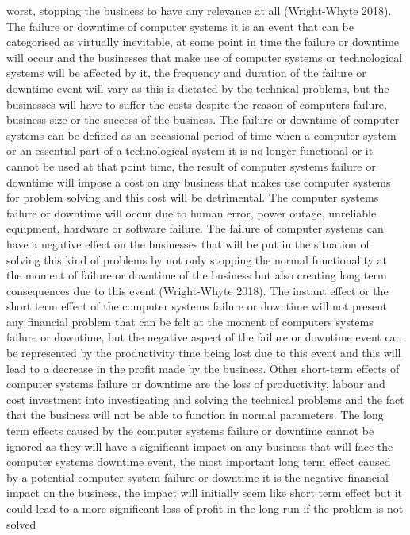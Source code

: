 worst, stopping the business to have any relevance at all (Wright-Whyte 2018).
\newpage
The failure or downtime of computer systems it is an event that can be categorised as virtually inevitable, at some point in time the failure or downtime will occur
and the businesses that make use of computer systems or technological systems will be affected by it, the frequency and
duration of the failure or downtime event will vary as this is dictated by the technical problems, but the businesses
will have to suffer the costs despite the reason of computers failure, business size or the success of the business.
The failure or downtime of computer systems can be defined as an occasional period of time when a computer system or
an essential part of a technological system it is no longer functional or it cannot be used at that point time, the
result of computer systems failure or downtime will impose a cost on any business that makes use computer systems for
problem solving and this cost will be detrimental.
The computer systems failure or downtime will occur due to human error, power outage, unreliable equipment, hardware or
software failure. The failure of computer systems can have a negative effect on the businesses that will be put in the
situation of solving this kind of problems by not only stopping the normal functionality at the moment of failure or
downtime of the business but also creating long term consequences due to this event (Wright-Whyte 2018).
The instant effect or the short term effect of the computer systems failure or downtime will not present any financial
problem that can be felt at the moment of computers systems failure or downtime, but the negative aspect of the failure
or downtime event can be represented by the productivity time being lost due to this event and this will lead to a
decrease in the profit made by the business. Other short-term effects of computer systems failure or downtime are the
loss of productivity, labour and cost investment into investigating and solving the technical problems and the fact
that the business will not be able to function in normal parameters. The long term effects caused by the computer
systems failure or downtime cannot be ignored as they will have a significant impact on any business that will face
the computer systems downtime event, the most important long term effect caused by a potential computer system
failure or downtime it is the negative financial impact on the business, the impact will initially seem like
short term effect but it could lead to a more significant loss of profit in the long run if the problem is not solved
